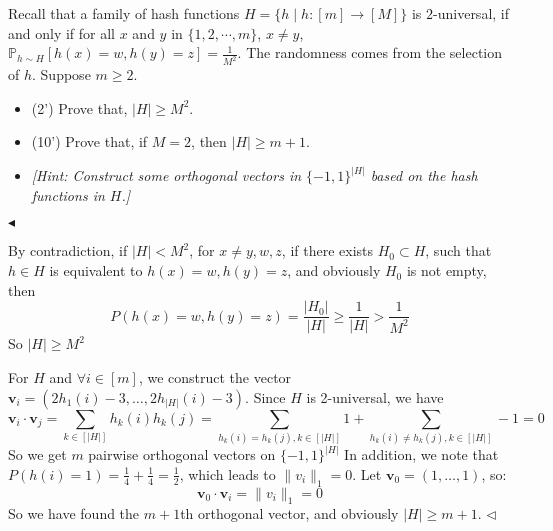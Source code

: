 \documentclass[11pt]{article}
\newenvironment{problem}[2][Problem]{\begin{trivlist}
\item[\hskip \labelsep {\bfseries #1}\hskip \labelsep {\bfseries #2.}]}{\hfill$\blacktriangleleft$\end{trivlist}}
\newenvironment{answer}[1][Answer]{\begin{trivlist}
\item[\hskip \labelsep {\bfseries #1.}\hskip \labelsep]}{\hfill$\lhd$\end{trivlist}}
\begin{document}
\begin{problem}{7 (12')}
Recall that a family of hash functions $H=\{h\mid h:[m]\to[M]\}$ is $2$-universal, if and only if for all $x$ and $y$ in $\{1,2,\cdots,m\}$, $x\ne y$, $\mathbb{P}_{h\sim H}[h(x)=w,h(y)=z]=\frac{1}{M^2}$. The randomness comes from the selection of $h$. Suppose $m\geq 2$.
\begin{itemize}
    \item [(1)] (2') Prove that, $|H|\geq M^2$.
    \item [(2)] (10') Prove that, if $M=2$, then $|H|\geq m + 1$.
    \item [] \textit{[Hint: Construct some orthogonal vectors in $\{-1,1\}^{|H|}$ based on the hash functions in $H$.]}
\end{itemize}
\end{problem}
\begin{answer}
    \item [(1)] By contradiction, if $|H|<M^2$, for $x\neq y,w,z$, if there exists $H_0\subset H$, such that $h\in H$ is equivalent to $h(x)=w,h(y)=z$, and obviously $H_0$ is not empty, then
$$P(h(x) = w,h(y) = z)=\frac{|H_0|}{|H|}\ge \frac{1}{|H|}>\frac{1}{M^2}$$
So $|H|\ge M^2$
    \item [(2)] For $H$ and $\forall i\in [m]$, we construct the vector $\bm v_i=(2h_1(i)-3,\dots,2h_{|H|}(i)-3)$. Since $H$ is 2-universal, we have
$$\bm v_i\cdot\bm v_j=\sum_{k\in[|H|]} h_k(i)h_k(j)=\sum_{h_k(i)=h_k(j),k\in[|H|]}1+\sum_{h_k(i)\neq h_k(j),k\in[|H|]}-1 = 0$$
    So we get $m$ pairwise orthogonal vectors on $\{-1,1\}^{|H|}$
In addition, we note that $P(h(i) = 1)=\frac{1}{4}+\frac{1}{4}=\frac{1}{2}$, which leads to $\|v_i\|_1=0$. Let $\bm v_0=(1,\dots,1)$, so:
$$\bm v_0\cdot\bm v_i=\|v_i\|_1=0$$
So we have found the $m+1$th orthogonal vector, and obviously $|H|\ge m+1$.
\end{answer}
\end{document}
